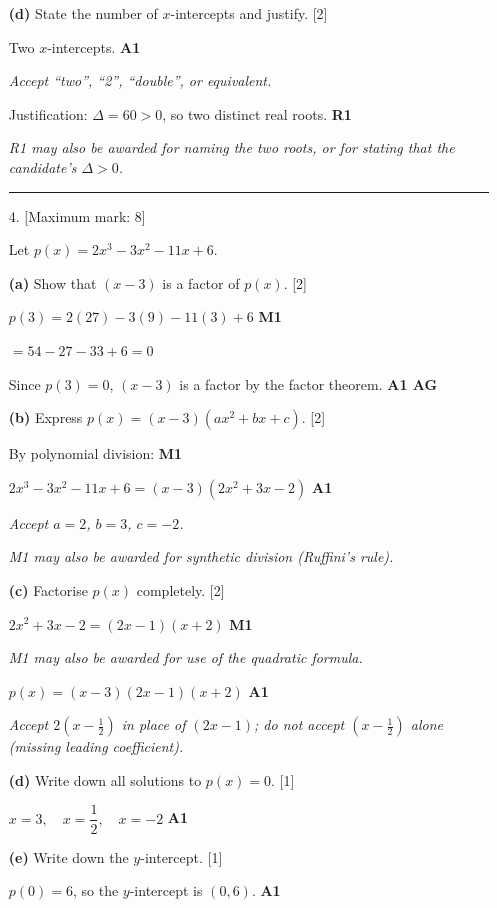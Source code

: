 \documentclass[12pt, twoside]{article}
\begin{document}
\begin{enumerate}[itemsep=0.3cm]
\medskip

\textbf{(d)} State the number of $x$-intercepts and justify. \hfill [2]

Two $x$-intercepts. \hfill \textbf{A1}

\emph{Accept ``two'', ``2'', ``double'', or equivalent.}

Justification: $\Delta = 60 > 0$, so two distinct real roots. \hfill \textbf{R1}

\emph{R1 may also be awarded for naming the two roots, or for stating that the candidate's $\Delta > 0$.}

\bigskip
\hrule
\bigskip

\item[4.] [Maximum mark: 8]

Let $p(x) = 2x^3 - 3x^2 - 11x + 6$.

\medskip

\textbf{(a)} Show that $(x - 3)$ is a factor of $p(x)$. \hfill [2]

$p(3) = 2(27) - 3(9) - 11(3) + 6$ \hfill \textbf{M1}

$= 54 - 27 - 33 + 6 = 0$

Since $p(3) = 0$, $(x - 3)$ is a factor by the
factor theorem. \hfill \textbf{A1 AG}

\medskip

\textbf{(b)} Express $p(x) = (x - 3)(ax^2 + bx + c)$. \hfill [2]

By polynomial division: \hfill \textbf{M1}

$2x^3 - 3x^2 - 11x + 6 = (x - 3)(2x^2 + 3x - 2)$ \hfill \textbf{A1}

\emph{Accept $a = 2$, $b = 3$, $c = -2$.}

\emph{M1 may also be awarded for synthetic division (Ruffini's rule).}

\medskip

\textbf{(c)} Factorise $p(x)$ completely. \hfill [2]

$2x^2 + 3x - 2 = (2x - 1)(x + 2)$ \hfill \textbf{M1}

\emph{M1 may also be awarded for use of the quadratic formula.}

$p(x) = (x - 3)(2x - 1)(x + 2)$ \hfill \textbf{A1}

\emph{Accept $2(x - \tfrac{1}{2})$ in place of $(2x - 1)$; do not accept $(x - \tfrac{1}{2})$ alone (missing leading coefficient).}

\medskip

\textbf{(d)} Write down all solutions to $p(x) = 0$. \hfill [1]

$x = 3, \quad x = \dfrac{1}{2}, \quad x = -2$ \hfill \textbf{A1}

\medskip

\textbf{(e)} Write down the $y$-intercept. \hfill [1]

$p(0) = 6$, so the $y$-intercept is $(0, 6)$. \hfill \textbf{A1}

\end{enumerate}
\end{document}

